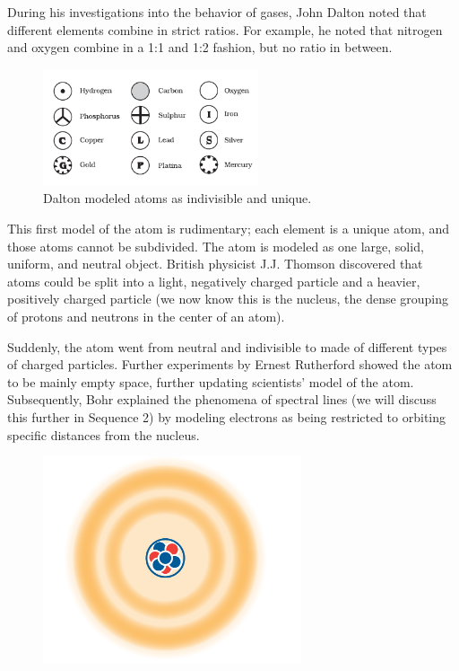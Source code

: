 During his investigations into the behavior of gases, John Dalton noted that 
different elements combine in strict ratios. For example, he noted that nitrogen 
and oxygen combine in a 1:1 and 1:2 fashion, but no ratio in between.

\begin{figure}
\noindent\includegraphics[width=2.5in, trim={0 0.5cm 0 0.5cm}, clip=true]{daltons_model.png}
\caption{Dalton modeled atoms as indivisible and unique.}
\end{figure}

This first model of the atom is rudimentary; each element is a unique atom,
and those atoms cannot be subdivided. The atom is modeled as one large, solid,
uniform, and neutral object. British physicist J.J. Thomson discovered that
atoms could be split into a light, negatively charged particle and a heavier,
positively charged particle (we now know this is the nucleus, the dense
grouping of protons and neutrons in the center of an atom).

Suddenly, the atom went from neutral and indivisible to made of different types
of charged particles. Further experiments by Ernest Rutherford showed the atom
to be mainly empty space, further updating scientists' model of the atom.
Subsequently, Bohr explained the phenomena of spectral lines (we will discuss
this further in Sequence 2) by modeling electrons as being restricted to
orbiting specific distances from the nucleus.

\begin{figure}
\noindent\includegraphics[width=3in]{atomCloud.png}
\caption{}
\label{fig:atomCloud}
\end{figure}

